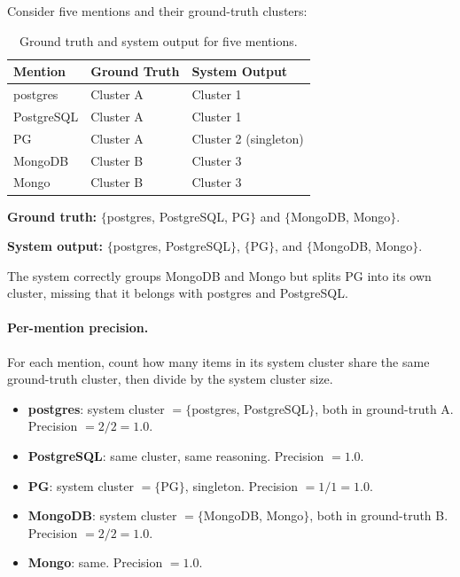 Consider five mentions and their ground-truth clusters:

\begin{table}[ht]
\centering
\caption{Ground truth and system output for five mentions.}
\label{tab:bcubed-example}
\begin{tabular}{l l l}
\toprule
\textbf{Mention} & \textbf{Ground Truth} & \textbf{System Output} \\
\midrule
postgres    & Cluster A & Cluster 1 \\
PostgreSQL  & Cluster A & Cluster 1 \\
PG          & Cluster A & Cluster 2 (singleton) \\
MongoDB     & Cluster B & Cluster 3 \\
Mongo       & Cluster B & Cluster 3 \\
\bottomrule
\end{tabular}
\end{table}

\noindent \textbf{Ground truth:} $\{$postgres, PostgreSQL, PG$\}$ and
$\{$MongoDB, Mongo$\}$.

\noindent \textbf{System output:} $\{$postgres, PostgreSQL$\}$, $\{$PG$\}$,
and $\{$MongoDB, Mongo$\}$.

The system correctly groups MongoDB and Mongo but splits PG into its own
cluster, missing that it belongs with postgres and PostgreSQL.

\paragraph{Per-mention precision.} For each mention, count how many items in
its system cluster share the same ground-truth cluster, then divide by the
system cluster size.

\begin{itemize}
    \item \textbf{postgres}: system cluster $= \{$postgres, PostgreSQL$\}$,
          both in ground-truth A. Precision $= 2/2 = 1.0$.
    \item \textbf{PostgreSQL}: same cluster, same reasoning. Precision $= 1.0$.
    \item \textbf{PG}: system cluster $= \{$PG$\}$, singleton. Precision
          $= 1/1 = 1.0$.
    \item \textbf{MongoDB}: system cluster $= \{$MongoDB, Mongo$\}$, both in
          ground-truth B. Precision $= 2/2 = 1.0$.
    \item \textbf{Mongo}: same. Precision $= 1.0$.
\end{itemize}

